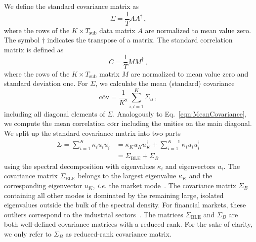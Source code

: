\documentclass[aps, pra, groupedaddress, showkeys, twocolumn, floatfix, 10pt]{revtex4-2}
\newcommand*\mean[1]{\overline{#1}}
\begin{document}
We define the standard covariance matrix as
%
\begin{equation} \label{eqn:CovarianceMatAADagger}
	\Sigma = \frac{1}{T} A A^{\dagger} \,,
\end{equation}
%
where the rows of the $K \times T_\text{sub}$  data matrix $A$ are normalized to mean value zero.
The symbol $\dagger$ indicates the transpose of a matrix.
The standard correlation matrix is defined as 
%
\begin{equation} \label{eqn:CorrelationMatMMDagger}
	C = \frac{1}{T} M M^{\dagger} \,,
\end{equation}
%
where the rows of  the $K \times T_\text{sub}$ matrix $M$ are normalized to mean value zero and standard deviation one.
For $\Sigma$, we calculate the mean (standard) covariance
%
\begin{equation} \label{eqn:MeanCovariance}
	\mean{\text{cov}} = \frac{1}{K^2} \sum_{i,l = 1}^K \Sigma_{il} \,,
\end{equation}
%
including all diagonal elements of $\Sigma$.
Analogously to Eq.~\eqref{eqn:MeanCovariance}, we compute the mean correlation $\mean{\text{corr}}$ including the unities on the main diagonal.
%
We split up the standard covariance matrix into two parts
%
\begin{align} \label{eqn:CovarianceMatSpectralDecomp}
	\Sigma = \sum_{i=1}^K \kappa_i u_i u^{\dagger}_i &= \kappa_K u_K u^{\dagger}_K + \sum_{i=1}^{K-1} \kappa_i u_i u^{\dagger}_i   \\
	&= \Sigma_{\text{BLE}} + \Sigma_{B} %
\end{align}
%
using the spectral decomposition with eigenvalues $\kappa_i$ and eigenvectors $u_i$. 
The covariance matrix $\Sigma_{\text{BLE}}$ belongs to the  largest eigenvalue $\kappa_K$ and the corresponding eigenvector $u_K$, \emph{i.e.} the market mode~\cite{MacMahon_2015,Allez_2012,Reigneron_2011}. The covariance matrix $\Sigma_{B}$ containing all other modes is dominated by the remaining large, isolated eigenvalues outside the bulk of the spectral density. For financial markets, these outliers correspond to the industrial sectors~\cite{Laloux_1999, Noh_2000, Gopikrishnan_2001, Plerou_2002, Song_2011, MacMahon_2015,  Stepanov_2015,Chetalova_2015,Benzaquen_2017,potters2020first}.   
The matrices $\Sigma_{\text{BLE}}$ and $\Sigma_B$ are both well-defined covariance matrices with a reduced rank.
For the sake of clarity, we only refer to $\Sigma_{{B}}$ as reduced-rank covariance matrix.
\end{document}
